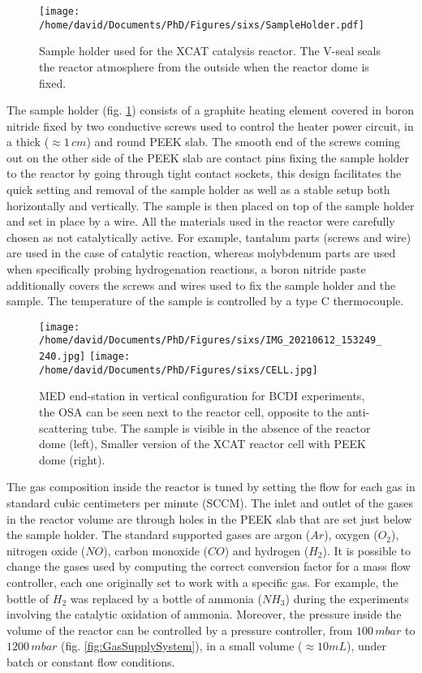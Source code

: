 \begin{figure}[!htb]
    \centering
    \texttt{[image: /home/david/Documents/PhD/Figures/sixs/SampleHolder.pdf]}
    \caption{
        Sample holder used for the XCAT catalysis reactor.
        The V-seal seals the reactor atmosphere from the outside when the reactor dome is fixed.
    }
    \label{fig:SampleHolder}
\end{figure}

The sample holder (fig. \ref{fig:SampleHolder}) consists of a graphite heating element covered in boron nitride fixed by two conductive screws used to control the heater power circuit, in a thick ($\approx 1 \, cm$) and round PEEK slab.
The smooth end of the screws coming out on the other side of the PEEK slab are contact pins fixing the sample holder to the reactor by going through tight contact sockets, this design facilitates the quick setting and removal of the sample holder as well as a stable setup both horizontally and vertically.
The sample is then placed on top of the sample holder and set in place by a wire.
All the materials used in the reactor were carefully chosen as not catalytically active.
For example, tantalum parts (screws and wire) are used in the case of catalytic reaction, whereas molybdenum parts are used when specifically probing hydrogenation reactions, a boron nitride paste additionally covers the screws and wires used to fix the sample holder and the sample.
The temperature of the sample is controlled by a type C thermocouple.

\begin{figure}[!htb]
    \centering
    \texttt{[image: /home/david/Documents/PhD/Figures/sixs/IMG\_20210612\_153249\_240.jpg]}
    \texttt{[image: /home/david/Documents/PhD/Figures/sixs/CELL.jpg]}
    \caption{
        MED end-station in vertical configuration for BCDI experiments, the OSA can be seen next to the reactor cell, opposite to the anti-scattering tube.
        The sample is visible in the absence of the reactor dome (left),
        Smaller version of the XCAT reactor cell with PEEK dome (right).
    }
    \label{fig:MEDV}
\end{figure}

The gas composition inside the reactor is tuned by setting the flow for each gas in standard cubic centimeters per minute (SCCM).
The inlet and outlet of the gases in the reactor volume are through holes in the PEEK slab that are set just below the sample holder.
The standard supported gases are argon ($Ar$), oxygen ($O_2$), nitrogen oxide ($NO$), carbon monoxide ($CO$) and hydrogen ($H_2$).
It is possible to change the gases used by computing the correct conversion factor for a mass flow controller, each one originally set to work with a specific gas.
For example, the bottle of $H_2$ was replaced by a bottle of ammonia ($NH_3$) during the experiments involving the catalytic oxidation of ammonia.
Moreover, the pressure inside the volume of the reactor can be controlled by a pressure controller, from $100 \, m\si{bar}$ to $1200 \, m\si{bar}$ (fig. \ref{fig:GasSupplySystem}), in a small volume ($\approx 10 mL$), under batch or constant flow conditions.

